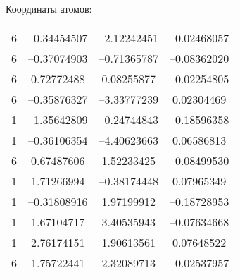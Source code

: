 {Координаты атомов:
\begin{center}
\begin{tabular}{cccc}
6 & --0.34454507& --2.12242451 &--0.02468057\\
6 &--0.37074903 &--0.71365787 &--0.08362020\\
6 &0.72772488 &0.08255877 &--0.02254805\\
6 &--0.35876327 &--3.33777239& 0.02304469\\
1 &--1.35642809 &--0.24744843& --0.18596358\\
1 &--0.36106354 &--4.40623663& 0.06586813\\
6 &0.67487606 &1.52233425 &--0.08499530\\
1 &1.71266994 &--0.38174448& 0.07965349\\
1 &--0.31808916& 1.97199912& --0.18728953\\
1 &1.67104717 &3.40535943 &--0.07634668\\
1 &2.76174151 &1.90613561 &0.07648522\\
6 &1.75722441 &2.32089713 &--0.02537957\\
 \end{tabular}
\end{center}

}
